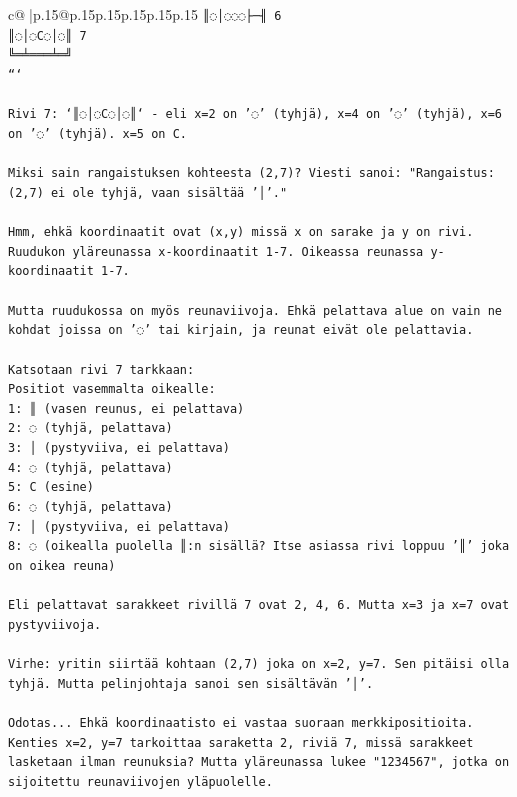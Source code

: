 \documentclass{article}
\begin{document}
{\begin{supertabular}{c@{$\;$}|p{.15\linewidth}@{}p{.15\linewidth}p{.15\linewidth}p{.15\linewidth}p{.15\linewidth}p{.15\linewidth}}
{{{\texttt{║◌│◌◌◌├─╢ 6} \\
\texttt{║◌│◌C◌│◌║ 7} \\
\texttt{╚═╧═══╧═╝} \\
\texttt{```} \\
\\ 
\texttt{Rivi 7: `║◌│◌C◌│◌║` {-} eli x=2 on '◌' (tyhjä), x=4 on '◌' (tyhjä), x=6 on '◌' (tyhjä). x=5 on C.} \\
\\ 
\texttt{Miksi sain rangaistuksen kohteesta (2,7)? Viesti sanoi: "Rangaistus: (2,7) ei ole tyhjä, vaan sisältää '│'."} \\
\\ 
\texttt{Hmm, ehkä koordinaatit ovat (x,y) missä x on sarake ja y on rivi. Ruudukon yläreunassa x{-}koordinaatit 1{-}7. Oikeassa reunassa y{-}koordinaatit 1{-}7.} \\
\\ 
\texttt{Mutta ruudukossa on myös reunaviivoja. Ehkä pelattava alue on vain ne kohdat joissa on '◌' tai kirjain, ja reunat eivät ole pelattavia.} \\
\\ 
\texttt{Katsotaan rivi 7 tarkkaan:} \\
\texttt{Positiot vasemmalta oikealle:} \\
\texttt{1: ║ (vasen reunus, ei pelattava)} \\
\texttt{2: ◌ (tyhjä, pelattava)} \\
\texttt{3: │ (pystyviiva, ei pelattava)} \\
\texttt{4: ◌ (tyhjä, pelattava)} \\
\texttt{5: C (esine)} \\
\texttt{6: ◌ (tyhjä, pelattava)} \\
\texttt{7: │ (pystyviiva, ei pelattava)} \\
\texttt{8: ◌ (oikealla puolella ║:n sisällä? Itse asiassa rivi loppuu '║' joka on oikea reuna)} \\
\\ 
\texttt{Eli pelattavat sarakkeet rivillä 7 ovat 2, 4, 6. Mutta x=3 ja x=7 ovat pystyviivoja.} \\
\\ 
\texttt{Virhe: yritin siirtää kohtaan (2,7) joka on x=2, y=7. Sen pitäisi olla tyhjä. Mutta pelinjohtaja sanoi sen sisältävän '│'.} \\
\\ 
\texttt{Odotas... Ehkä koordinaatisto ei vastaa suoraan merkkipositioita. Kenties x=2, y=7 tarkoittaa saraketta 2, riviä 7, missä sarakkeet lasketaan ilman reunuksia? Mutta yläreunassa lukee "1234567", jotka on sijoitettu reunaviivojen yläpuolelle.} \\
}}}
\end{supertabular}}
\end{document}
